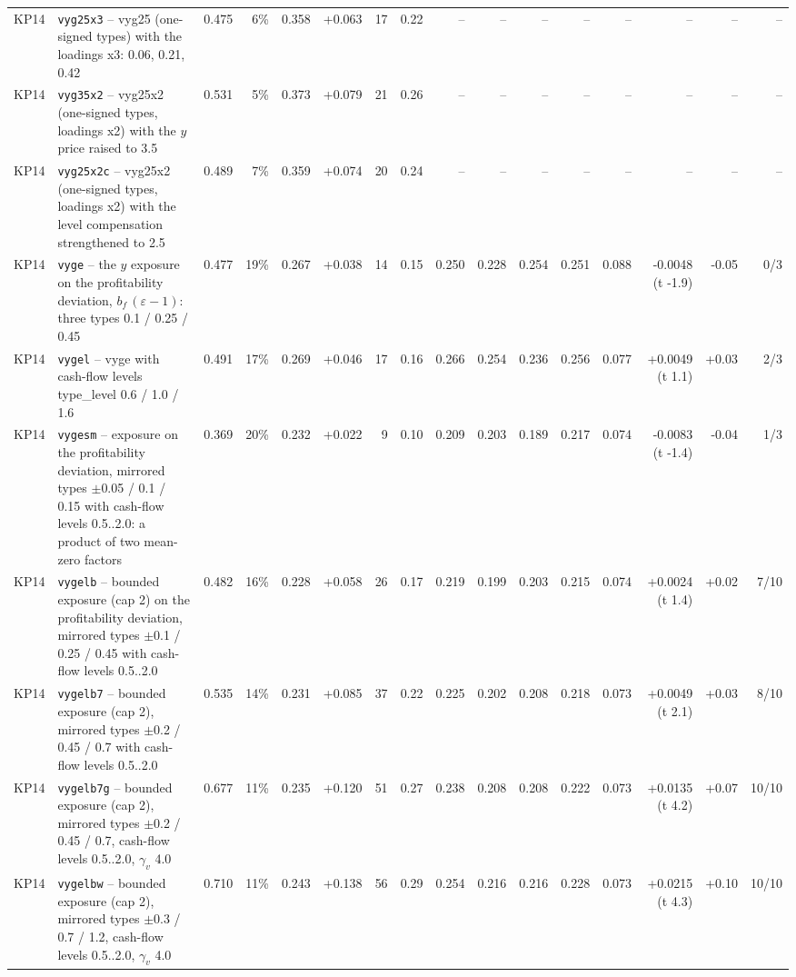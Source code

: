 \begin{landscape}
\begin{longtable}{lp{4.6cm}rrrrrrrrrrrrrr}
KP14 & \texttt{vyg25x3} -- vyg25 (one-signed types) with the loadings x3: 0.06, 0.21, 0.42 & 0.475 & 6\% & 0.358 & +0.063 & 17 & 0.22 & -- & -- & -- & -- & -- & -- & -- & -- \\
KP14 & \texttt{vyg35x2} -- vyg25x2 (one-signed types, loadings x2) with the $y$ price raised to 3.5 & 0.531 & 5\% & 0.373 & +0.079 & 21 & 0.26 & -- & -- & -- & -- & -- & -- & -- & -- \\
KP14 & \texttt{vyg25x2c} -- vyg25x2 (one-signed types, loadings x2) with the level compensation strengthened to 2.5 & 0.489 & 7\% & 0.359 & +0.074 & 20 & 0.24 & -- & -- & -- & -- & -- & -- & -- & -- \\
KP14 & \texttt{vyge} -- the $y$ exposure on the profitability deviation, $b_f\,(\varepsilon - 1)$: three types 0.1 / 0.25 / 0.45 & 0.477 & 19\% & 0.267 & +0.038 & 14 & 0.15 & 0.250 & 0.228 & 0.254 & 0.251 & 0.088 & -0.0048 (t -1.9) & -0.05 & 0/3 \\
KP14 & \texttt{vygel} -- vyge with cash-flow levels type\_level 0.6 / 1.0 / 1.6 & 0.491 & 17\% & 0.269 & +0.046 & 17 & 0.16 & 0.266 & 0.254 & 0.236 & 0.256 & 0.077 & +0.0049 (t 1.1) & +0.03 & 2/3 \\
KP14 & \texttt{vygesm} -- exposure on the profitability deviation, mirrored types $\pm$0.05 / 0.1 / 0.15 with cash-flow levels 0.5..2.0: a product of two mean-zero factors & 0.369 & 20\% & 0.232 & +0.022 & 9 & 0.10 & 0.209 & 0.203 & 0.189 & 0.217 & 0.074 & -0.0083 (t -1.4) & -0.04 & 1/3 \\
KP14 & \texttt{vygelb} -- bounded exposure (cap 2) on the profitability deviation, mirrored types $\pm$0.1 / 0.25 / 0.45 with cash-flow levels 0.5..2.0 & 0.482 & 16\% & 0.228 & +0.058 & 26 & 0.17 & 0.219 & 0.199 & 0.203 & 0.215 & 0.074 & +0.0024 (t 1.4) & +0.02 & 7/10 \\
KP14 & \texttt{vygelb7} -- bounded exposure (cap 2), mirrored types $\pm$0.2 / 0.45 / 0.7 with cash-flow levels 0.5..2.0 & 0.535 & 14\% & 0.231 & +0.085 & 37 & 0.22 & 0.225 & 0.202 & 0.208 & 0.218 & 0.073 & +0.0049 (t 2.1) & +0.03 & 8/10 \\
KP14 & \texttt{vygelb7g} -- bounded exposure (cap 2), mirrored types $\pm$0.2 / 0.45 / 0.7, cash-flow levels 0.5..2.0, $\gamma_v$ 4.0 & 0.677 & 11\% & 0.235 & +0.120 & 51 & 0.27 & 0.238 & 0.208 & 0.208 & 0.222 & 0.073 & +0.0135 (t 4.2) & +0.07 & 10/10 \\
KP14 & \texttt{vygelbw} -- bounded exposure (cap 2), mirrored types $\pm$0.3 / 0.7 / 1.2, cash-flow levels 0.5..2.0, $\gamma_v$ 4.0 & 0.710 & 11\% & 0.243 & +0.138 & 56 & 0.29 & 0.254 & 0.216 & 0.216 & 0.228 & 0.073 & +0.0215 (t 4.3) & +0.10 & 10/10 \\

\end{longtable}
\end{landscape}
